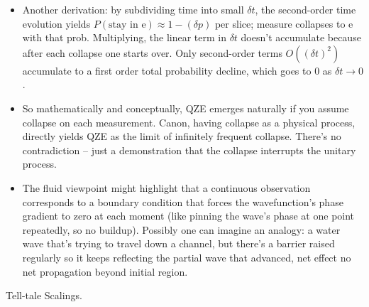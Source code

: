 \documentclass[11pt]{article}
\begin{document}
\begin{itemize}
\item 
Another derivation: by subdividing time into small $\delta t$, the second-order time evolution yields $P(\text{stay in e}) \approx 1 - (\delta p)$ per slice; measure collapses to e with that prob. Multiplying, the linear term in $\delta t$ doesn’t accumulate because after each collapse one starts over. Only second-order terms $O((\delta t)^2)$ accumulate to a first order total probability decline, which goes to 0 as $\delta t \to 0$.




\item 
So mathematically and conceptually, QZE emerges naturally if you assume collapse on each measurement. Canon, having collapse as a physical process, directly yields QZE as the limit of infinitely frequent collapse. There’s no contradiction – just a demonstration that the collapse interrupts the unitary process.




\item 
The fluid viewpoint might highlight that a continuous observation corresponds to a boundary condition that forces the wavefunction’s phase gradient to zero at each moment (like pinning the wave’s phase at one point repeatedly, so no buildup). Possibly one can imagine an analogy: a water wave that’s trying to travel down a channel, but there’s a barrier raised regularly so it keeps reflecting the partial wave that advanced, net effect no net propagation beyond initial region.




\end{itemize}

Tell-tale Scalings.
\end{document}
